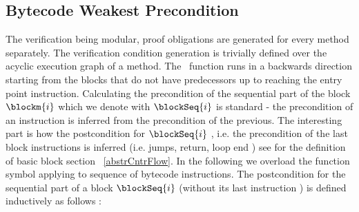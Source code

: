 

\subsection{Bytecode Weakest Precondition}\label{wpGraph}

The verification being modular, proof obligations are generated for every method separately. The verification condition generation 
is trivially defined over the acyclic execution graph of a method. 
The \wpi \ function runs in a backwards  direction starting from the blocks that do not have predecessors up to reaching the entry point
 instruction.  Calculating the precondition of the sequential part of the block $\blockm{i}$ 
 which we denote with  $\blockSeq{i}$  is standard - the precondition of an instruction  is inferred from the precondition of the previous.
The  interesting part is how the postcondition  for $\blockSeq{i}$ , i.e. the precondition of the last block instructions is inferred 
(i.e. jumps, return, loop end ) see for the definition of basic block section ~\ref{abstrCntrFlow}.  In the following we overload the function 
symbol \wpi applying to sequence of bytecode instructions.
The postcondition for the sequential part of a block  $\blockSeq{i}$ (without its last instruction )   is defined inductively 
 as follows :

